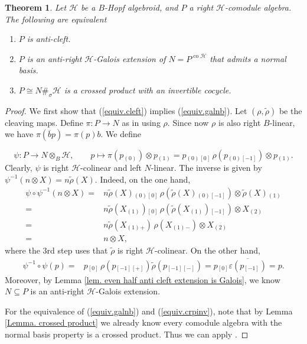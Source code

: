 \documentclass[a4paper,reqno]{amsart}
\numberwithin{equation}{section}
\theoremstyle{plain}
\newtheorem{thm}{Theorem}[section]
\theoremstyle{remark}
\numberwithin{equation}{section}
\newcommand{\ot}{\otimes}
\newcommand\ol{\overline}
\newcommand{\trho}{{\tilde{\rho}}}
\newcommand{\z}{{}_{\scriptscriptstyle{(0)}}}
\newcommand{\rz}{{}_{\scriptscriptstyle{[0]}}}
\renewcommand{\o}{{}_{\scriptscriptstyle{(1)}}}
\newcommand{\rmo}{{}_{\scriptscriptstyle{[-1]}}}
\renewcommand{\t}{{}_{\scriptscriptstyle{(2)}}}
\newcommand{\CH}{\mathcal{H}}
\newcommand\co{{\operatorname{co}}}
\begin{document}
\begin{thm}\label{classical char of cleft extensions}
Let $\CH$ be a $B$-Hopf algebroid, and $P$ a right $\CH$-comodule algebra. The following are equivalent
\begin{enumerate}
    \item \label{equiv.cleft} $P$ is anti-cleft.
    \item \label{equiv.galnb} $P$ is an anti-right $\CH$-Galois extension of $N=P^{\co\CH}$ that admits a normal basis.
    \item \label{equiv.crpinv} $P\cong N\#_\sigma\CH$ is a crossed product with an invertible cocycle.
\end{enumerate}
\end{thm}
\begin{proof}
   We first show that (\ref{equiv.cleft}) implies (\ref{equiv.galnb}).  Let $(\rho, \trho)$ be the cleaving maps. Define $\pi\colon P\to N$ as in  using $\rho$. Since now $\rho$ is also right $B$-linear, we have $\pi(\ol bp)=\pi(p)b$. We define
   
    \[\psi:P\to N\ot_{B}\CH,\qquad p\mapsto \pi(p\z)\ot p\o= p\z\rz\,\rho(p\z\rmo)\ot p\o. \]
    Clearly, $\psi$ is right $\CH$-colinear and left $N$-linear. The inverse is given by $\psi^{-1}(n\ot X)=n\trho(X)$. Indeed, on the one hand,
    \begin{align*}
        \psi\circ \psi^{-1}(n\ot X)=&n\trho(X)\z\rz\,\rho(\trho(X)\z\rmo)\ot \trho(X)\o\\
        =&n\trho(X\o)\rz\,\rho(\trho(X\o)\rmo)\ot X\t\\
        =&n\trho(X\o{}_{+})\,\rho(X\o{}_{-})\ot X\t\\
        =&n\ot X,
    \end{align*}
    where the 3rd step uses that $\trho$ is right $\CH$-colinear. On the other hand,
    \begin{align*}
        \psi^{-1}\circ\psi(p)=&p\rz\,\rho(p\rmo{}_{[+]})\trho (p\rmo{}_{[-]})=p\rz\overline{\varepsilon(p\rmo)}=p.
    \end{align*}
    Moreover, by Lemma \ref{lem. even half anti cleft extension is Galois}, we know $N\subseteq P$ is an anti-right $\CH$-Galois extension.


   For the equivalence of (\ref{equiv.galnb}) and (\ref{equiv.crpinv}), note that by Lemma \ref{Lemma. crossed product} we already know every comodule algebra with the normal basis property is a crossed product. Thus we can apply .
   


\end{proof}
\end{document}
